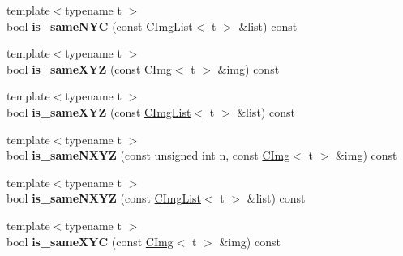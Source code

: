 \begin{DoxyCompactItemize}
\item 
\hypertarget{structcimg__library_1_1CImgList_a672a8a0e8632161d9a6e80a39617dd5a}{
{\footnotesize template$<$typename t $>$ }\\bool {\bfseries is\_\-sameNYC} (const \hyperlink{structcimg__library_1_1CImgList}{CImgList}$<$ t $>$ \&list) const }
\label{structcimg__library_1_1CImgList_a672a8a0e8632161d9a6e80a39617dd5a}

\item 
\hypertarget{structcimg__library_1_1CImgList_a0fbd732196771e98d2d3418eb03f1d77}{
{\footnotesize template$<$typename t $>$ }\\bool {\bfseries is\_\-sameXYZ} (const \hyperlink{structcimg__library_1_1CImg}{CImg}$<$ t $>$ \&img) const }
\label{structcimg__library_1_1CImgList_a0fbd732196771e98d2d3418eb03f1d77}

\item 
\hypertarget{structcimg__library_1_1CImgList_ae0b8d7a177ec44efb3455b38b4326073}{
{\footnotesize template$<$typename t $>$ }\\bool {\bfseries is\_\-sameXYZ} (const \hyperlink{structcimg__library_1_1CImgList}{CImgList}$<$ t $>$ \&list) const }
\label{structcimg__library_1_1CImgList_ae0b8d7a177ec44efb3455b38b4326073}

\item 
\hypertarget{structcimg__library_1_1CImgList_a09a86eb8684cce93ffc06edda66bd94f}{
{\footnotesize template$<$typename t $>$ }\\bool {\bfseries is\_\-sameNXYZ} (const unsigned int n, const \hyperlink{structcimg__library_1_1CImg}{CImg}$<$ t $>$ \&img) const }
\label{structcimg__library_1_1CImgList_a09a86eb8684cce93ffc06edda66bd94f}

\item 
\hypertarget{structcimg__library_1_1CImgList_ad13e0412c5a526bfe5c9f553c5e16968}{
{\footnotesize template$<$typename t $>$ }\\bool {\bfseries is\_\-sameNXYZ} (const \hyperlink{structcimg__library_1_1CImgList}{CImgList}$<$ t $>$ \&list) const }
\label{structcimg__library_1_1CImgList_ad13e0412c5a526bfe5c9f553c5e16968}

\item 
\hypertarget{structcimg__library_1_1CImgList_a5468ee115db0e739ea554f5747e7ad16}{
{\footnotesize template$<$typename t $>$ }\\bool {\bfseries is\_\-sameXYC} (const \hyperlink{structcimg__library_1_1CImg}{CImg}$<$ t $>$ \&img) const }
\label{structcimg__library_1_1CImgList_a5468ee115db0e739ea554f5747e7ad16}


\end{DoxyCompactItemize}
